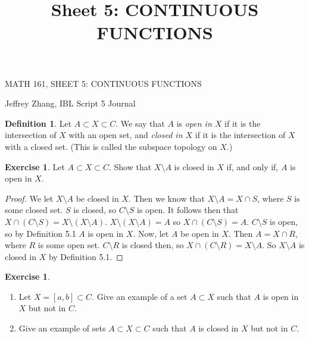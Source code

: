 \documentclass[12pt]{article}
\title{Sheet 5: CONTINUOUS FUNCTIONS}
\renewcommand{\_}[1]{\underline{ #1 }}
\theoremstyle{definition}
\newtheorem{definition}[theorem]{Definition}
\newtheorem{exercise}[theorem]{Exercise}
\numberwithin{equation}{subsection}
\begin{document}
\begin{center}
{\large MATH 161, SHEET 5: CONTINUOUS FUNCTIONS} \\ 
\vspace{.2in}  
\end{center}
Jeffrey Zhang, IBL Script 5 Journal
\bigskip \bigskip


\setcounter{section}{5}   



\begin{definition} Let $A\subset X\subset C$. 
We say that $A$ is {\em  open in $X$} 
if it is the intersection of $X$ with an open set,
and {\em closed in $X$} if it is the intersection of $X$ with a closed set. (This is called the subspace topology on $X$.)
\end{definition}

\begin{exercise} Let $A\subset X\subset C$. Show that $X\setminus A$ is closed in $X$ if, and only if, $A$ is open in $X$.
\end{exercise}

\begin{proof}
We let $X \setminus A$ be closed in $X$. Then we know that $X \setminus A = X \cap S$, where $S$ is some closed set.  $S$ is closed, so $C \setminus S$ is open. It follows then that $X \cap (C \setminus S) = X \setminus (X \setminus A)$. $X \setminus (X \setminus A) = A$ so $X \cap (C \setminus S) = A$. $C \setminus S$ is open, so by Definition 5.1 $A$ is open in $X$. 
Now, let $A$ be open in $X$. Then $A = X \cap R$, where $R$ is some open set. $C \setminus R$ is closed then, so $X \cap (C \setminus R) = X \setminus A$. So $X \setminus A$ is closed in $X$ by Definition 5.1.
\end{proof}

\begin{exercise}
\renewcommand{\theenumi}{\alph{enumi}}
\begin{enumerate}
\item Let $X=[a,b]\subset C$. Give an example of a set $A\subset X$ such that $A$ is open in $X$ but not in $C$.
\item Give an example of sets $A\subset X\subset C$ such that $A$ is closed in $X$ but not in $C$. 
\end{enumerate}
\end{exercise}
\end{document}
